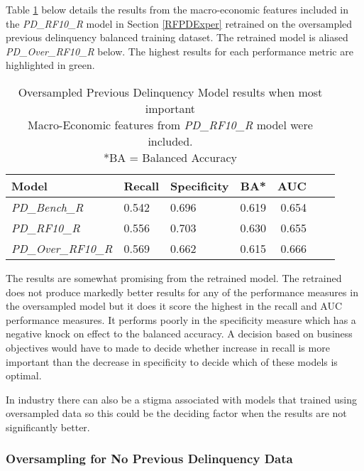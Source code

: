 Table \ref{table:overPD} below details the results from the macro-economic features included in the \textit{PD\_RF10\_R} model in Section \ref{RFPDExper} retrained on the oversampled previous delinquency balanced training dataset. The retrained model is aliased \textit{PD\_Over\_RF10\_R} below. The highest results for each performance metric are highlighted in green.

\begin{table}[H]
	\centering
	\small
		\begin{tabular}{l l l r r r r}
			\hline
			\textbf{Model} & \textbf{Recall} & \textbf{Specificity} & \textbf{BA*} & \textbf{AUC}  \\ \hline
			\textit{PD\_Bench\_R} & 0.542 & 0.696 & 0.619 & 0.654 \\ \hline
			\textit{PD\_RF10\_R} & 0.556 & \cellcolor{green!25}0.703 & \cellcolor{green!25}0.630 & 0.655  \\ 
			\textit{PD\_Over\_RF10\_R}  & \cellcolor{green!25}0.569 & 0.662 & 0.615 & \cellcolor{green!25}0.666   \\ \hline
		\end{tabular}
	\caption{{Oversampled Previous Delinquency Model results when most important\\
			Macro-Economic features from \textit{PD\_RF10\_R} model were included.
			\\ *BA = Balanced Accuracy}}
	\label{table:overPD}
\end{table}

The results are somewhat promising from the retrained model. The retrained does not produce markedly better results for any of the performance measures in the oversampled model but it does it score the highest in the recall and AUC performance measures. It performs poorly in the specificity measure which has a negative knock on effect to the balanced accuracy. A decision based on business objectives would have to made to decide whether increase in recall is more important than the decrease in specificity to decide which of these models is optimal. 

In industry there can also be a stigma associated with models that trained using oversampled data so this could be the deciding factor when the results are not significantly better.

\subsubsection{Oversampling for No Previous Delinquency Data}

